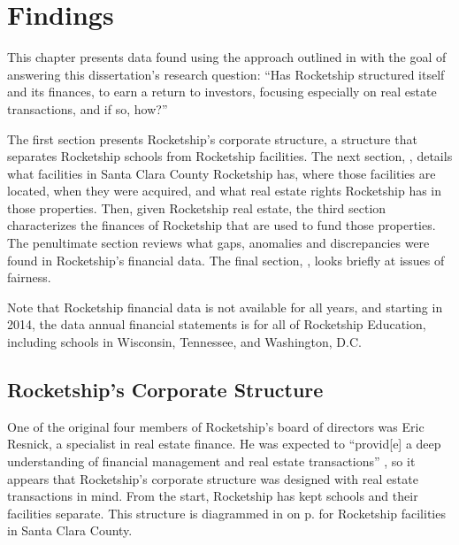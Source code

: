 
\chapter{Findings}%
\label{ch:findings}

This chapter presents data found using the approach outlined in  with the goal of answering this dissertation's research question: ``Has Rocketship structured itself and its finances, to earn a return to investors, focusing especially on real estate transactions, and if so, how?''

The first section presents Rocketship's corporate structure, a structure that separates Rocketship schools from Rocketship facilities. The next section, , details what facilities in Santa Clara County Rocketship has, where those facilities are located, when they were acquired, and what real estate rights Rocketship has in those properties. Then, given Rocketship real estate, the third section characterizes the finances of Rocketship that are used to fund those properties. The penultimate section reviews what gaps, anomalies and discrepancies were found in Rocketship's financial data. The final section, , looks briefly at issues of fairness.

Note that Rocketship financial data is not available for all years, and starting in 2014, the data annual financial statements is for all of Rocketship Education, including schools in Wisconsin, Tennessee, and Washington, D.C.


\section{Rocketship's Corporate Structure}%
\label{sec:RSED-corporate-structure}\indent%

One of the original four members of Rocketship's board of directors was Eric Resnick, a specialist in real estate finance. He was expected to ``provid[e] a deep understanding of financial management and real estate transactions'' \parencite[13]{Danner2006}, so it appears that Rocketship's corporate structure was designed with real estate transactions in mind. From the start, Rocketship has kept schools and their facilities separate. This structure is diagrammed in  on p.\pageref{fig:corporate-structure} for Rocketship facilities in Santa Clara County.


